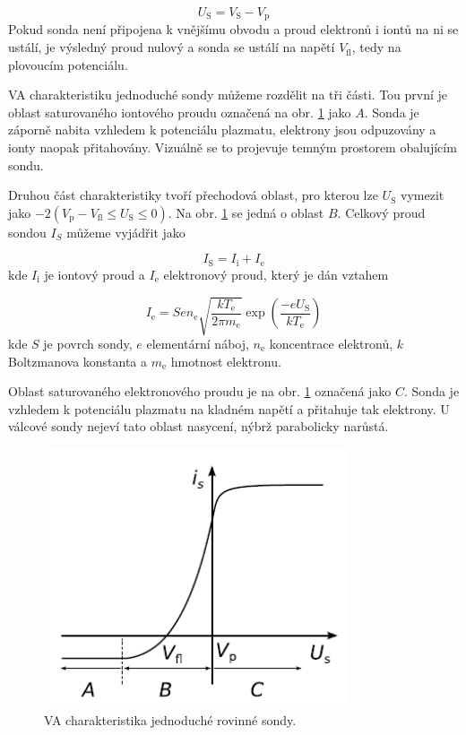 \documentclass[a4paper,12pt]{article}
\begin{document}
\begin{equation}
	U_\text{S} = V_\text{S} - V_\text{p}
	\label{Usondy}
\end{equation}
Pokud sonda není připojena k vnějšímu obvodu a proud elektronů i iontů na ni se ustálí, je výsledný proud nulový a sonda se ustálí na napětí $V_\text{{fl}}$, tedy na plovoucím potenciálu.

VA charakteristiku jednoduché sondy můžeme rozdělit na tři části. Tou první je oblast saturovaného iontového proudu označená na obr.
\ref{VA} jako $A$. Sonda je záporně nabita vzhledem k potenciálu plazmatu, elektrony jsou odpuzovány a ionty naopak přitahovány. Vizuálně se to projevuje temným prostorem obalujícím sondu.

Druhou část charakteristiky tvoří přechodová oblast, pro kterou lze $U_\text{S}$ vymezit jako $-2(V_\text{p} - V_\text{{fl}} \leq
U_\text{S} \leq 0)$. Na obr. \ref{VA} se jedná o oblast $B$. Celkový proud sondou $I_S$ můžeme vyjádřit jako

\begin{equation}
	I_\text{S} = I_\text{i} + I_\text{e}
\end{equation}
kde $I_\text{i}$ je iontový proud a $I_\text{e}$ elektronový proud, který je dán vztahem

\begin{equation}
	I_\text{e} = S e n_\text{e} \sqrt{\frac{k T_\text{e}}{2 \pi m_\text{e}}} \exp \left(\frac{-eU_\text{S}}{k T_\text{e}}\right)
	\label{eproud}
\end{equation}
kde $S$ je povrch sondy, $e$ elementární náboj, $n_\text{e}$ koncentrace elektronů, $k$ Boltzmanova konstanta a $m_\text{e}$ hmotnost
elektronu.

Oblast saturovaného elektronového proudu je na obr. \ref{VA} označená jako $C$. Sonda je vzhledem k potenciálu plazmatu na kladném
napětí a přitahuje tak elektrony. U válcové sondy nejeví tato oblast nasycení, nýbrž parabolicky narůstá.


\begin{figure}[h]
	\centering
	\includegraphics[width=90mm]{VA.png}
	\caption{VA charakteristika jednoduché rovinné sondy.}
	\label{VA}
\end{figure}	
\newpage
\end{document}
